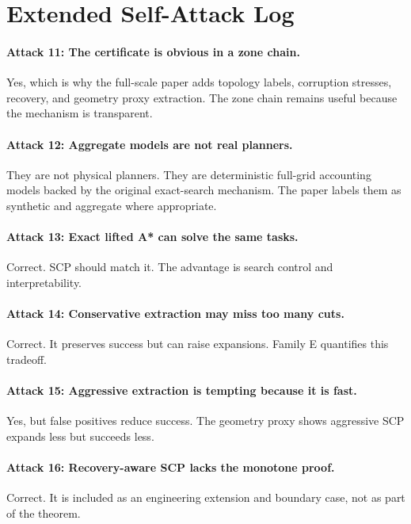 \documentclass{article}
\begin{document}
\section{Extended Self-Attack Log}

\paragraph{Attack 11: The certificate is obvious in a zone chain.}
Yes, which is why the full-scale paper adds topology labels, corruption stresses, recovery, and geometry proxy extraction. The zone chain remains useful because the mechanism is transparent.

\paragraph{Attack 12: Aggregate models are not real planners.}
They are not physical planners. They are deterministic full-grid accounting models backed by the original exact-search mechanism. The paper labels them as synthetic and aggregate where appropriate.

\paragraph{Attack 13: Exact lifted A* can solve the same tasks.}
Correct. SCP should match it. The advantage is search control and interpretability.

\paragraph{Attack 14: Conservative extraction may miss too many cuts.}
Correct. It preserves success but can raise expansions. Family E quantifies this tradeoff.

\paragraph{Attack 15: Aggressive extraction is tempting because it is fast.}
Yes, but false positives reduce success. The geometry proxy shows aggressive SCP expands less but succeeds less.

\paragraph{Attack 16: Recovery-aware SCP lacks the monotone proof.}
Correct. It is included as an engineering extension and boundary case, not as part of the theorem.
\end{document}
